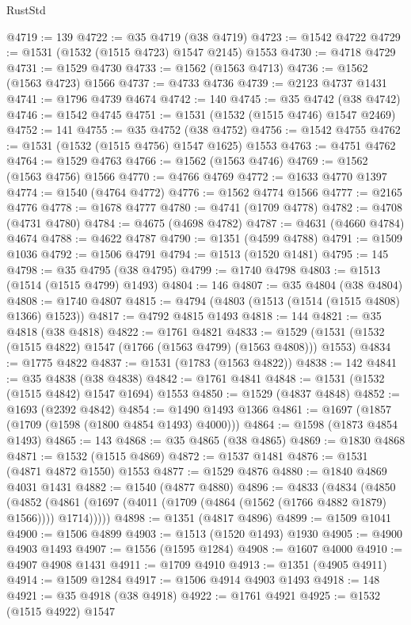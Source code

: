 \begin{lexlean}{RustStd}
\begin{coremodule}
@4719 := 139
@4722 := @35 @4719 (@38 @4719)
@4723 := @1542 @4722
@4729 := @1531 (@1532 (@1515 @4723) @1547 @2145) @1553
@4730 := @4718 @4729
@4731 := @1529 @4730
@4733 := @1562 (@1563 @4713)
@4736 := @1562 (@1563 @4723) @1566
@4737 := @4733 @4736
@4739 := @2123 @4737 @1431
@4741 := @1796 @4739 @4674
@4742 := 140
@4745 := @35 @4742 (@38 @4742)
@4746 := @1542 @4745
@4751 := @1531 (@1532 (@1515 @4746) @1547 @2469)
@4752 := 141
@4755 := @35 @4752 (@38 @4752)
@4756 := @1542 @4755
@4762 := @1531 (@1532 (@1515 @4756) @1547 @1625) @1553
@4763 := @4751 @4762
@4764 := @1529 @4763
@4766 := @1562 (@1563 @4746)
@4769 := @1562 (@1563 @4756) @1566
@4770 := @4766 @4769
@4772 := @1633 @4770 @1397
@4774 := @1540 (@4764 @4772)
@4776 := @1562 @4774 @1566
@4777 := @2165 @4776
@4778 := @1678 @4777
@4780 := @4741 (@1709 @4778)
@4782 := @4708 (@4731 @4780)
@4784 := @4675 (@4698 @4782)
@4787 := @4631 (@4660 @4784) @4674
@4788 := @4622 @4787
@4790 := @1351 (@4599 @4788)
@4791 := @1509 @1036
@4792 := @1506 @4791
@4794 := @1513 (@1520 @1481)
@4795 := 145
@4798 := @35 @4795 (@38 @4795)
@4799 := @1740 @4798
@4803 := @1513 (@1514 (@1515 @4799) @1493)
@4804 := 146
@4807 := @35 @4804 (@38 @4804)
@4808 := @1740 @4807
@4815 := @4794 (@4803 (@1513 (@1514 (@1515 @4808) @1366) @1523))
@4817 := @4792 @4815 @1493
@4818 := 144
@4821 := @35 @4818 (@38 @4818)
@4822 := @1761 @4821
@4833 := @1529 (@1531 (@1532 (@1515 @4822) @1547 (@1766 (@1563 @4799) (@1563 @4808))) @1553)
@4834 := @1775 @4822
@4837 := @1531 (@1783 (@1563 @4822))
@4838 := 142
@4841 := @35 @4838 (@38 @4838)
@4842 := @1761 @4841
@4848 := @1531 (@1532 (@1515 @4842) @1547 @1694) @1553
@4850 := @1529 (@4837 @4848)
@4852 := @1693 (@2392 @4842)
@4854 := @1490 @1493 @1366
@4861 := @1697 (@1857 (@1709 (@1598 (@1800 @4854 @1493) @4000)))
@4864 := @1598 (@1873 @4854 @1493)
@4865 := 143
@4868 := @35 @4865 (@38 @4865)
@4869 := @1830 @4868
@4871 := @1532 (@1515 @4869)
@4872 := @1537 @1481
@4876 := @1531 (@4871 @4872 @1550) @1553
@4877 := @1529 @4876
@4880 := @1840 @4869 @4031 @1431
@4882 := @1540 (@4877 @4880)
@4896 := @4833
    (@4834
      (@4850
        (@4852 (@4861 (@1697 (@4011 (@1709 (@4864 (@1562 (@1766 @4882 @1879) @1566)))) @1714)))))
@4898 := @1351 (@4817 @4896)
@4899 := @1509 @1041
@4900 := @1506 @4899
@4903 := @1513 (@1520 @1493) @1930
@4905 := @4900 @4903 @1493
@4907 := @1556 (@1595 @1284)
@4908 := @1607 @4000
@4910 := @4907 @4908 @1431
@4911 := @1709 @4910
@4913 := @1351 (@4905 @4911)
@4914 := @1509 @1284
@4917 := @1506 @4914 @4903 @1493
@4918 := 148
@4921 := @35 @4918 (@38 @4918)
@4922 := @1761 @4921
@4925 := @1532 (@1515 @4922) @1547

\end{coremodule}
\end{lexlean}
